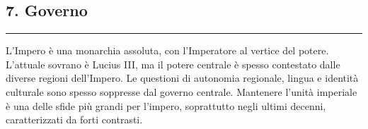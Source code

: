 \subsection{7. Governo}\label{governo}

\begin{center}\rule{0.5\linewidth}{0.5pt}\end{center}

L'Impero è una monarchia assoluta, con l'Imperatore al vertice del
potere. L'attuale sovrano è Lucius III, ma il potere centrale è spesso
contestato dalle diverse regioni dell'Impero. Le questioni di autonomia
regionale, lingua e identità culturale sono spesso soppresse dal governo
centrale. Mantenere l'unità imperiale è una delle sfide più grandi per
l'impero, soprattutto negli ultimi decenni, caratterizzati da forti
contrasti.
